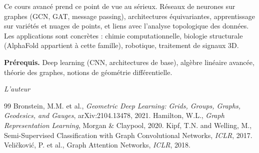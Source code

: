 \documentclass[12pt,a4paper,twoside]{book}
\theoremstyle{definition}
\theoremstyle{plain}
\theoremstyle{remark}
\begin{document}
\medskip

Ce cours avanc\'e prend ce point de vue au s\'erieux. R\'eseaux de neurones sur graphes (GCN, GAT, message passing), architectures \'equivariantes, apprentissage sur vari\'et\'es et nuages de points, et liens avec l'analyse topologique des donn\'ees. Les applications sont concr\`etes : chimie computationnelle, biologie structurale (AlphaFold appartient \`a cette famille), robotique, traitement de signaux 3D.

\medskip

\noindent\textbf{Pr\'erequis.} Deep learning (CNN, architectures de base), alg\`ebre lin\'eaire avanc\'ee, th\'eorie des graphes, notions de g\'eom\'etrie diff\'erentielle.

\vfill
\hfill\textit{L'auteur}


\mainmatter














\backmatter
\begin{thebibliography}{99}
 Bronstein, M.M. et al., \emph{Geometric Deep Learning: Grids, Groups, Graphs, Geodesics, and Gauges}, arXiv:2104.13478, 2021.
 Hamilton, W.L., \emph{Graph Representation Learning}, Morgan \& Claypool, 2020.
 Kipf, T.N. and Welling, M., Semi-Supervised Classification with Graph Convolutional Networks, \emph{ICLR}, 2017.
 Veli\v{c}kovi\'c, P. et al., Graph Attention Networks, \emph{ICLR}, 2018.
\end{thebibliography}
\printindex
\end{document}

